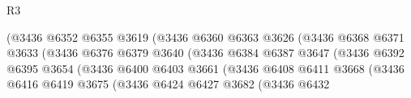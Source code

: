 \begin{lexlean}{R3}
\begin{coremodule}
                                              (@3436
                                                @6352
                                                @6355
                                                @3619
                                                (@3436
                                                  @6360
                                                  @6363
                                                  @3626
                                                  (@3436
                                                    @6368
                                                    @6371
                                                    @3633
                                                    (@3436
                                                      @6376
                                                      @6379
                                                      @3640
                                                      (@3436
                                                        @6384
                                                        @6387
                                                        @3647
                                                        (@3436
                                                          @6392
                                                          @6395
                                                          @3654
                                                          (@3436
                                                            @6400
                                                            @6403
                                                            @3661
                                                            (@3436
                                                              @6408
                                                              @6411
                                                              @3668
                                                              (@3436
                                                                @6416
                                                                @6419
                                                                @3675
                                                                (@3436
                                                                  @6424
                                                                  @6427
                                                                  @3682
                                                                  (@3436
                                                                    @6432

\end{coremodule}
\end{lexlean}
